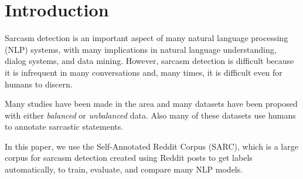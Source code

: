 

\chapter{Introduction}%
\label{cha:introduction}

Sarcasm detection is an important aspect of many natural language processing
(NLP) systems, with many implications in natural language understanding, dialog
systems, and data mining. However, sarcasm detection is difficult because it is
infrequent in many conversations and, many times, it is difficult even for
humans to discern.

Many studies have been made in the area and many datasets have been proposed
with either \textit{balanced} or \textit{unbalanced} data. Also many of these
datasets use humans to annotate sarcastic statements.

In this paper, we use the Self-Annotated Reddit Corpus (SARC), which is a large
corpus for sarcasm detection created using Reddit posts to get labels
automatically, to train, evaluate, and compare many NLP models.
